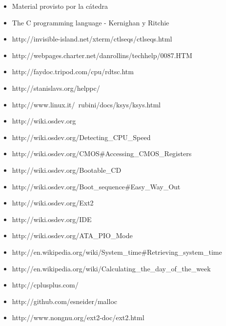\documentclass[a4paper,10pt]{article}
\begin{document}
\begin{itemize}
  \item Material provisto por la cátedra
  \item The C programming language - Kernighan y Ritchie
  \item http://invisible-island.net/xterm/ctlseqs/ctlseqs.html
  \item http://webpages.charter.net/danrollins/techhelp/0087.HTM
  \item http://faydoc.tripod.com/cpu/rdtsc.htm
  \item http://stanislavs.org/helppc/
  \item http://www.linux.it/~rubini/docs/ksys/ksys.html
  \item http://wiki.osdev.org
  \item http://wiki.osdev.org/Detecting\_CPU\_Speed
  \item	http://wiki.osdev.org/CMOS\#Accessing\_CMOS\_Registers
  \item http://wiki.osdev.org/Bootable\_CD
  \item http://wiki.osdev.org/Boot\_sequence\#Easy\_Way\_Out
  \item http://wiki.osdev.org/Ext2
  \item http://wiki.osdev.org/IDE
  \item http://wiki.osdev.org/ATA\_PIO\_Mode
  \item http://en.wikipedia.org/wiki/System\_time\#Retrieving\_system\_time
  \item http://en.wikipedia.org/wiki/Calculating\_the\_day\_of\_the\_week
  \item http://cplusplus.com/
  \item http://github.com/esneider/malloc
  \item http://www.nongnu.org/ext2-doc/ext2.html
\end{itemize}
   
\end{document}
